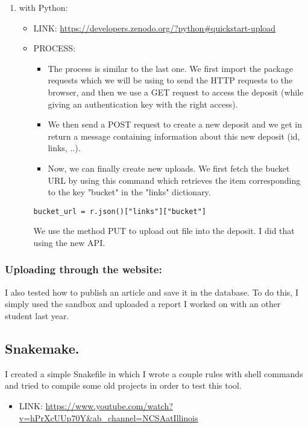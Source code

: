 \documentclass[11pt]{article}
\begin{document}
\begin{enumerate}
\item with Python:
\label{sec:org8680c92}
\begin{itemize}
\item LINK: \url{https://developers.zenodo.org/?python\#quickstart-upload}
\item PROCESS:
\begin{itemize}
\item The process is similar to the last one. We first import the
package requests which we will be using to send the HTTP
requests to the browser, and then we use a GET request to
access the deposit (while giving an authentication key with
the right access).
\item We then send a POST request to create a new deposit and we
get in return a message containing information about this
new deposit (id, links, ..).
\item Now, we can finally create new uploads. We first fetch the
bucket URL by using this command which retrieves the item
corresponding to the key "bucket" in the "links" dictionary.
\end{itemize}
\begin{verbatim}
bucket_url = r.json()["links"]["bucket"]
\end{verbatim}

We use the method PUT to upload out file into the deposit.
I did that using the new API.
\end{itemize}
\end{enumerate}
\subsubsection{Uploading through the website:}
\label{sec:orgc85108f}
I also tested how to publish an article and save it in the
database. To do this, I simply used the sandbox and uploaded
a report I worked on with an other student last year.


\subsection{Snakemake.}
\label{sec:orgd19ddf0}
I created a simple Snakefile in which I wrote a couple rules with
shell commands and tried to compile some old projects in order to
test this tool. 
\begin{itemize}
\item LINK:
\url{https://www.youtube.com/watch?v=hPrXcUUp70Y\&ab\_channel=NCSAatIllinois}
\end{itemize}
\end{document}
